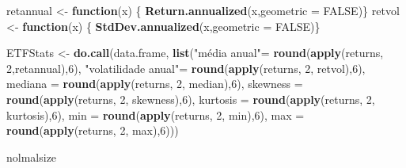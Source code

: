 \documentclass[
  12pt,
  a4paper,
  openany]{book}
\newenvironment{Shaded}{\begin{snugshade}}{\end{snugshade}}
\newcommand{\ControlFlowTok}[1]{\textcolor[rgb]{0.13,0.29,0.53}{\textbf{#1}}}
\newcommand{\DataTypeTok}[1]{\textcolor[rgb]{0.13,0.29,0.53}{#1}}
\newcommand{\DecValTok}[1]{\textcolor[rgb]{0.00,0.00,0.81}{#1}}
\newcommand{\KeywordTok}[1]{\textcolor[rgb]{0.13,0.29,0.53}{\textbf{#1}}}
\newcommand{\NormalTok}[1]{#1}
\newcommand{\OtherTok}[1]{\textcolor[rgb]{0.56,0.35,0.01}{#1}}
\newcommand{\StringTok}[1]{\textcolor[rgb]{0.31,0.60,0.02}{#1}}
\begin{document}
\justifying
\bigskip
\scriptsize

\begin{Shaded}
\begin{Highlighting}[]
\NormalTok{retannual \textless{}{-}}\StringTok{ }\ControlFlowTok{function}\NormalTok{(x) \{  }
  \KeywordTok{Return.annualized}\NormalTok{(x,}\DataTypeTok{geometric =} \OtherTok{FALSE}\NormalTok{)\}}
\NormalTok{retvol \textless{}{-}}\StringTok{ }\ControlFlowTok{function}\NormalTok{(x) \{  }
  \KeywordTok{StdDev.annualized}\NormalTok{(x,}\DataTypeTok{geometric =} \OtherTok{FALSE}\NormalTok{)\}}

\NormalTok{ETFStats \textless{}{-}}\StringTok{ }\KeywordTok{do.call}\NormalTok{(data.frame, }
                    \KeywordTok{list}\NormalTok{(}\StringTok{"média anual"}\NormalTok{=}\StringTok{ }\KeywordTok{round}\NormalTok{(}\KeywordTok{apply}\NormalTok{(returns, }\DecValTok{2}\NormalTok{,retannual),}\DecValTok{6}\NormalTok{),}
                         \StringTok{"volatilidade anual"}\NormalTok{=}\StringTok{ }\KeywordTok{round}\NormalTok{(}\KeywordTok{apply}\NormalTok{(returns, }\DecValTok{2}\NormalTok{, retvol),}\DecValTok{6}\NormalTok{),}
                         \DataTypeTok{mediana =} \KeywordTok{round}\NormalTok{(}\KeywordTok{apply}\NormalTok{(returns, }\DecValTok{2}\NormalTok{, median),}\DecValTok{6}\NormalTok{),}
                         \DataTypeTok{skewness =} \KeywordTok{round}\NormalTok{(}\KeywordTok{apply}\NormalTok{(returns, }\DecValTok{2}\NormalTok{, skewness),}\DecValTok{6}\NormalTok{),}
                         \DataTypeTok{kurtosis =} \KeywordTok{round}\NormalTok{(}\KeywordTok{apply}\NormalTok{(returns, }\DecValTok{2}\NormalTok{, kurtosis),}\DecValTok{6}\NormalTok{),}
                         \DataTypeTok{min =} \KeywordTok{round}\NormalTok{(}\KeywordTok{apply}\NormalTok{(returns, }\DecValTok{2}\NormalTok{, min),}\DecValTok{6}\NormalTok{),}
                         \DataTypeTok{max =} \KeywordTok{round}\NormalTok{(}\KeywordTok{apply}\NormalTok{(returns, }\DecValTok{2}\NormalTok{, max),}\DecValTok{6}\NormalTok{)))}
\end{Highlighting}
\end{Shaded}

nolmalsize
\end{document}
